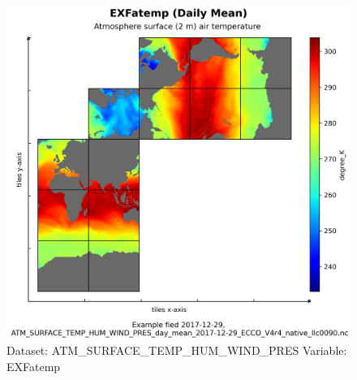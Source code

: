 \begin{figure}[H]
\centering
\includegraphics[width=\textwidth]{../images/plots/native_plots/Atmosphere_Surface_Temperature_Humidity_Wind_and_Pressure/EXFatemp.png}
\caption{Dataset: ATM\_SURFACE\_TEMP\_HUM\_WIND\_PRES Variable: EXFatemp}
\label{tab:table-ATM_SURFACE_TEMP_HUM_WIND_PRES_EXFatemp-Plot}
\end{figure}
\pagebreak
